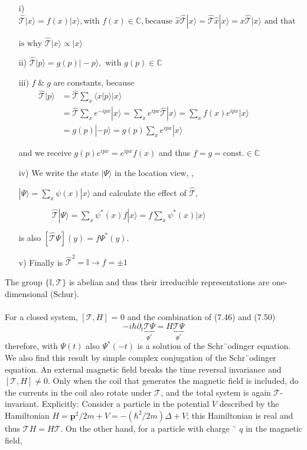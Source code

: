 \begin{enumerate}
    \item[i)] $ {\hat{\mathcal{T}}|x\rangle= f(x)|x\rangle, \text{with } f(x) \in \mathbb{C}, \text{because } \hat{x} \hat{\mathcal{T}}|x\rangle=\hat{\mathcal{T}} \hat{x}|x\rangle= x \hat{\mathcal{T}}|x\rangle} {\text { and that}}$
    \item[] ${\text{is why } \hat{\mathcal{T}}|x\rangle \propto|x\rangle}$
    \item[ii)]$\hat{\mathcal{T}}|p\rangle=g(p)|-p\rangle, \text{ with }g(p)\in\mathbb{C}$ 
    \item[iii)] $f \;\&\; g$ are constants, because\\
        $\begin{aligned} \qquad\hat{\mathcal{T}}|p\rangle &=\hat{\mathcal{T}} \sum_{x}\langle x | p\rangle|x\rangle \\ &=\hat{\mathcal{T}} \sum_{x} e^{-i p x}|x\rangle=\sum_{x} e^{i p x} \hat{\mathcal{T}}|x\rangle=\sum_{x} f(x) e^{i p x}|x\rangle \\ &= g(p)|-p\rangle= g(p) \sum_{x} e^{i p x}|x\rangle \end{aligned}$
    \item[] and we receive $g(p)e^{ipx}=e^{ipx}f(x)$ and thus $f=g=\text{const}.\in\mathbb{C}$
    \item[iv)] We write the state $|\Psi\rangle$ in the location view, ,
    \item[] $|\Psi\rangle=\sum_x \psi(x)|x\rangle$ and calculate the effect of $\hat{\mathcal{T}}$, 
    \item[] $\qquad\qquad \hat{\mathcal{T}}|\Psi\rangle=\sum_{x} \psi^{*}(x) f|x\rangle= f \sum_{x} \psi^{*}(x)|x\rangle$
    \item[] is also $[\hat{\mathcal{T}}\Psi](y)=f\Psi^*(y).$
    \item[v)] Finally is $\hat{\mathcal{T}}^{2}=\mathbb{I} \rightarrow f=\pm 1$
\end{enumerate}
The group $\{\mathbb{I}, \mathcal{T}\}$ is abelian and thus their irreducible representations are one-dimensional (Schur).\\\\
For a closed system, $ [\mathcal{T}, H]$ = 0 and the combination of (7.46) and (7.50)
\begin{equation}
    -i \hbar \partial_{t} \underbrace{\mathcal{T} \Psi}_{\Psi^{*}}=H \underbrace{\mathcal{T} \Psi}_{\Psi^{*}}
    \end{equation}
therefore, with $\Psi (t)$ also $\Psi^* (- t)$ is a solution of the Schr¨odinger equation. We also find this result by simple complex conjugation of the Schr¨odinger equation. An external magnetic field breaks the time reversal invariance and $[\mathcal{T}, H] \neq 0$. Only when the coil that generates the magnetic field is included, do the currents in the coil also rotate under $\mathcal{T}$, and the total system is again $\mathcal{T}$-invariant. Explicitly: Consider a particle in the potential $V$ described by the Hamiltonian $H=\textbf{p}^2/2m+V=-(\hbar^2/2m)\Delta+V$; this Hamiltonian is real and thus $\mathcal{T}H=H\mathcal{T}$. On the other hand, for a particle with charge ¨ $q$ in the magnetic field,
